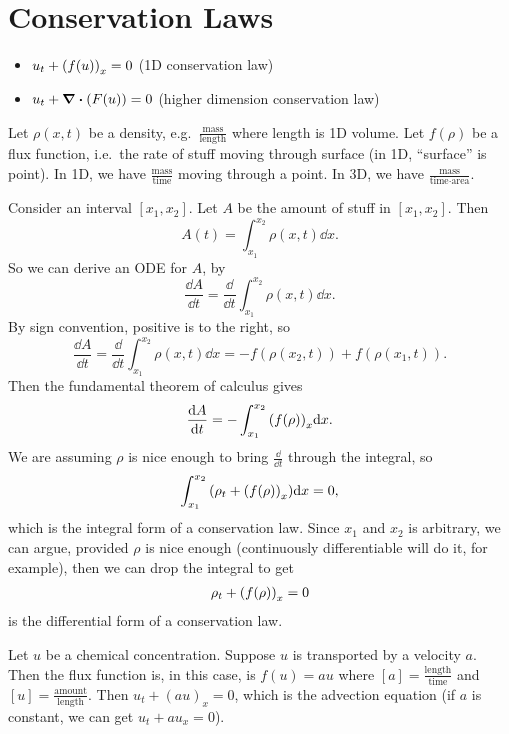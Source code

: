 \documentclass{article}
\begin{document}
    \section{Conservation Laws}

        \begin{itemize}
            \item $u_t + \qty(f(u))_x = 0$ (1D conservation law)
            \item $u_t + \div \qty(F(u)) = 0$ (higher dimension conservation law)
        \end{itemize}

        Let $\rho(x,t)$ be a density, e.g.~$\frac{\text{mass}}{\text{length}}$ where length is 1D volume.  Let $f(\rho)$ be a flux function, i.e.~the rate of stuff moving through surface (in 1D, ``surface'' is point).  In 1D, we have $\frac{\text{mass}}{\text{time}}$ moving through a point.  In 3D, we have $\frac{\text{mass}}{\text{time}\cdot\text{area}}$.

        Consider an interval $[x_1,x_2]$.  Let $A$ be the amount of stuff in $[x_1,x_2]$.  Then $$A(t) = \int_{x_1}^{x_2}\rho(x,t)\dd x.$$
        So we can derive an ODE for $A$, by $$\frac{\dd A}{\dd t} = \frac{\dd}{\dd t}\int_{x_1}^{x_2}\rho(x,t)\dd x.$$  By sign convention, positive is to the right, so $$\frac{\dd A}{\dd t} = \frac{\dd}{\dd t}\int_{x_1}^{x_2}\rho(x,t)\dd x = -f(\rho(x_2,t)) + f(\rho(x_1,t)).$$  Then the fundamental theorem of calculus gives $$\frac{\dd A}{\dd t} = -\int_{x_1}^{x_2}\qty(f(\rho))_x\dd x.$$  We are assuming $\rho$ is nice enough to bring $\frac{\dd}{\dd t}$ through the integral, so
        \begin{align*}
            \int_{x_1}^{x_2}\qty(\rho_t + \qty(f(\rho))_x)\dd x = 0,
        \end{align*}
        which is the integral form of a conservation law.  Since $x_1$ and $x_2$ is arbitrary, we can argue, provided $\rho$ is nice enough (continuously differentiable will do it, for example), then we can drop the integral to get
        \begin{align*}
            \rho_t + \qty(f(\rho))_x = 0
        \end{align*}
        is the differential form of a conservation law.

        Let $u$ be a chemical concentration.  Suppose $u$ is transported by a velocity $a$.  Then the flux function is, in this case, is $f(u) = au$ where $[a] = \frac{\text{length}}{\text{time}}$ and $[u] = \frac{\text{amount}}{\text{length}}$.  Then $u_t + (au)_x = 0$, which is the advection equation (if $a$ is constant, we can get $u_t + au_x = 0$).
\end{document}
